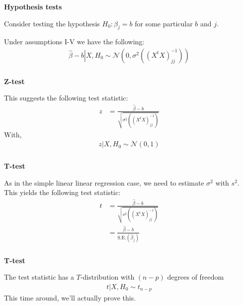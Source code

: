 \begin{frame}[fragile] \frametitle{}

{\bf Hypothesis tests}

Consider testing the hypothesis $H_0: \beta_j = b$ for
some particular $b$ and $j$.

\pause Under assumptions I-V we have the following:
\begin{align*}
\left. \widehat{\beta} - b \right| X, H_0 \sim \mathcal{N} ( 0, \sigma^2 \left( (X^t X)^{-1}_{jj} \right))
\end{align*}

\end{frame}


\begin{frame}[fragile] \frametitle{}

{\bf Z-test}

This suggests the following test statistic:
\begin{align*}
z &= \frac{\widehat{\beta} - b}{\sqrt{\sigma^2  \left( (X^t X)^{-1}_{jj} \right)}}
\end{align*}
With,
\begin{align*}
\left. z \right| X, H_0 \sim \mathcal{N} (0, 1)
\end{align*}

\end{frame}

\begin{frame}[fragile] \frametitle{}

{\bf T-test}

As in the simple linear linear regression case, we need to estimate
$\sigma^2$ with $s^2$. This yields the following test statistic:
\begin{align*}
t &= \frac{\widehat{\beta} - b}{\sqrt{s^2  \left( (X^t X)^{-1}_{jj} \right)}} \\
&= \frac{\widehat{\beta} - b}{\text{S.E.}(\widehat{\beta}_j)}
\end{align*}


\end{frame}

\begin{frame}[fragile] \frametitle{}

{\bf T-test}

The test statistic has a $T$-distribution  with $(n-p)$ degrees
of freedom
\begin{align*}
\left. t \right| X, H_0 \sim t_{n-p}
\end{align*}
\pause This time around, we'll actually prove this.

\end{frame}


